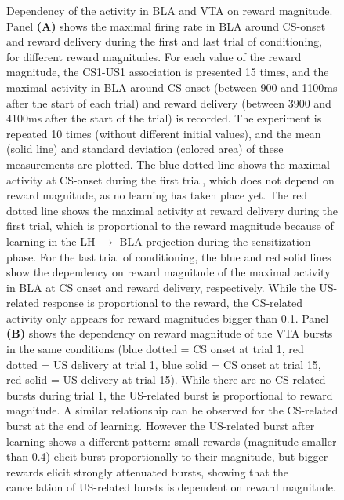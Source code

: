 \documentclass[
  11pt,
  a4paper,
]{scrbook}
\begin{document}
\begin{figure}


\caption{\label{fig-finr:us_magnitude}Dependency of the activity in BLA
and VTA on reward magnitude. Panel \textbf{(A)} shows the maximal firing
rate in BLA around CS-onset and reward delivery during the first and
last trial of conditioning, for different reward magnitudes. For each
value of the reward magnitude, the CS1-US1 association is presented 15
times, and the maximal activity in BLA around CS-onset (between 900 and
1100ms after the start of each trial) and reward delivery (between 3900
and 4100ms after the start of the trial) is recorded. The experiment is
repeated 10 times (without different initial values), and the mean
(solid line) and standard deviation (colored area) of these measurements
are plotted. The blue dotted line shows the maximal activity at CS-onset
during the first trial, which does not depend on reward magnitude, as no
learning has taken place yet. The red dotted line shows the maximal
activity at reward delivery during the first trial, which is
proportional to the reward magnitude because of learning in the LH
\(\rightarrow\) BLA projection during the sensitization phase. For the
last trial of conditioning, the blue and red solid lines show the
dependency on reward magnitude of the maximal activity in BLA at CS
onset and reward delivery, respectively. While the US-related response
is proportional to the reward, the CS-related activity only appears for
reward magnitudes bigger than 0.1. Panel \textbf{(B)} shows the
dependency on reward magnitude of the VTA bursts in the same conditions
(blue dotted = CS onset at trial 1, red dotted = US delivery at trial 1,
blue solid = CS onset at trial 15, red solid = US delivery at trial 15).
While there are no CS-related bursts during trial 1, the US-related
burst is proportional to reward magnitude. A similar relationship can be
observed for the CS-related burst at the end of learning. However the
US-related burst after learning shows a different pattern: small rewards
(magnitude smaller than 0.4) elicit burst proportionally to their
magnitude, but bigger rewards elicit strongly attenuated bursts, showing
that the cancellation of US-related bursts is dependent on reward
magnitude.}

\end{figure}%
\end{document}
